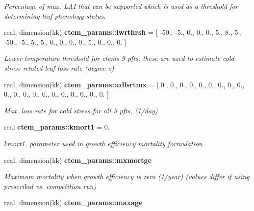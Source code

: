 \begin{DoxyCompactItemize}
\begin{DoxyCompactList}\small\item\em Percentage of max. L\+A\+I that can be supported which is used as a threshold for determining leaf phenology status. \end{DoxyCompactList}\item 
\hypertarget{namespacectem__params_abef1f9707a8519b0dd657de37edc26b1}{}real, dimension(kk) {\bfseries ctem\+\_\+params\+::lwrthrsh} = \mbox{[} -\/50., -\/5., 0., 0., 0., 5., 8., 5., -\/50., -\/5., 5., 5., 0., 0., 0., 0., 5., 0., 0., 0. \mbox{]}\label{namespacectem__params_abef1f9707a8519b0dd657de37edc26b1}

\begin{DoxyCompactList}\small\item\em Lower temperature threshold for ctem\textquotesingle{}s 9 pfts. these are used to estimate cold stress related leaf loss rate (degree c) \end{DoxyCompactList}\item 
\hypertarget{namespacectem__params_a22b7dcf204415799531485f3e75e91a9}{}real, dimension(kk) {\bfseries ctem\+\_\+params\+::cdlsrtmx} = \mbox{[} 0., 0., 0., 0., 0., 0., 0., 0., 0., 0., 0., 0., 0., 0., 0., 0., 0., 0., 0., 0. \mbox{]}\label{namespacectem__params_a22b7dcf204415799531485f3e75e91a9}

\begin{DoxyCompactList}\small\item\em Max. loss rate for cold stress for all 9 pfts, (1/day) \end{DoxyCompactList}\item 
\hypertarget{namespacectem__params_a7847d74c6ea4e5d157002a72f86036c1}{}real {\bfseries ctem\+\_\+params\+::kmort1} = 0.\label{namespacectem__params_a7847d74c6ea4e5d157002a72f86036c1}

\begin{DoxyCompactList}\small\item\em kmort1, parameter used in growth efficiency mortality formulation \end{DoxyCompactList}\item 
\hypertarget{namespacectem__params_aeb439e2ba908efa216016855a3f2b166}{}real, dimension(kk) {\bfseries ctem\+\_\+params\+::mxmortge}\label{namespacectem__params_aeb439e2ba908efa216016855a3f2b166}

\begin{DoxyCompactList}\small\item\em Maximum mortality when growth efficiency is zero (1/year) (values differ if using prescribed vs. competition run) \end{DoxyCompactList}\item 
\hypertarget{namespacectem__params_a90ed5402c77306a5b310717f1201a5d9}{}real, dimension(kk) {\bfseries ctem\+\_\+params\+::maxage}\label{namespacectem__params_a90ed5402c77306a5b310717f1201a5d9}


\end{DoxyCompactItemize}
